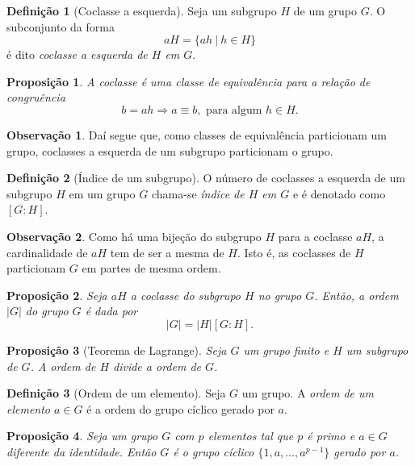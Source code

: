 \documentclass[a4paper,12pt]{report}
\theoremstyle{plain}
\newtheorem{proposicao}{Proposição}[section]
\theoremstyle{definition}
\newtheorem{definicao}{Definição}[section]
\newtheorem{observacao}{Observação}[section]
\begin{document}
\begin{definicao}[Coclasse a esquerda]
	Seja um subgrupo \(H\) de um grupo \(G\). O
	subconjunto da forma \[aH = \{ah \ | \ h\in H\}\] é dito \emph{coclasse a esquerda de \(H\) em \(G\)}.
\end{definicao}

\begin{proposicao}
	A coclasse é uma classe de equivalência para a
	relação de congruência
	\[b = ah \Rightarrow a \equiv b, \text{ para algum } h\in H.\]	
\end{proposicao}

\begin{observacao}
	Daí segue que, como classes de equivalência particionam um grupo,
	coclasses a esquerda de um subgrupo particionam o grupo.
\end{observacao}

\begin{definicao}[Índice de um subgrupo]
	O número de coclasses a esquerda de um subgrupo
	\(H\) em um grupo \(G\) chama-se \emph{índice de \(H\) em \(G\)} e é
	denotado como \([G:H]\).	
\end{definicao}

\begin{observacao}
	Como há uma bijeção do subgrupo \(H\) para a coclasse \(aH\), a
	cardinalidade de \(aH\) tem de ser a mesma de \(H\). Isto é, as
	coclasses de \(H\) particionam \(G\) em partes de mesma ordem.
\end{observacao}

\begin{proposicao}
	Seja \(aH\) a coclasse do subgrupo \(H\) no grupo
	\(G\). Então, a ordem \(|G|\) do grupo \(G\) é dada por
	\[|G| = |H|[G:H].\]	
\end{proposicao}

\begin{proposicao}[Teorema de Lagrange]
	Seja \(G\) um grupo finito e
	\(H\) um subgrupo de \(G\). A ordem de \(H\) divide a ordem de \(G\).
\end{proposicao}

\begin{definicao}[Ordem de um elemento]
	Seja \(G\) um grupo. A \emph{ordem de um elemento \(a\in G\)} é a ordem do grupo cíclico gerado por \(a\).	
\end{definicao}

\begin{proposicao}
	Seja um grupo \(G\) com \(p\) elementos tal que
	\(p\) é primo e \(a\in G\) diferente da identidade. Então \(G\) é o
	grupo cíclico \(\{1,a,\dots,a^{p-1}\}\) gerado por \(a\).
\end{proposicao}
\end{document}
